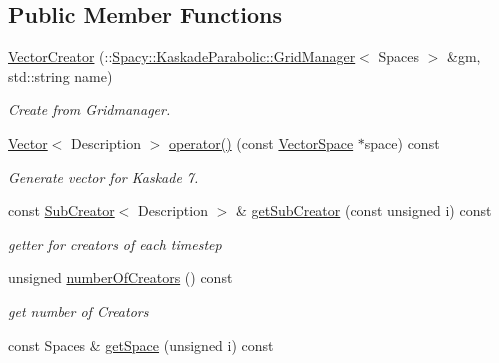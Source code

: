 \subsection*{Public Member Functions}
\begin{DoxyCompactItemize}
\item 
\hyperlink{group__VectorSpaceGroup_ga9312a30ec070498e2364676714caf125}{Vector\-Creator} (\-::\hyperlink{classSpacy_1_1KaskadeParabolic_1_1GridManager}{Spacy\-::\-Kaskade\-Parabolic\-::\-Grid\-Manager}$<$ Spaces $>$ \&gm, std\-::string name)
\begin{DoxyCompactList}\small\item\em Create from Gridmanager. \end{DoxyCompactList}\item 
\hypertarget{classSpacy_1_1KaskadeParabolic_1_1VectorCreator_a45f48ed0e7f995aaa3e85c5755a94aeb}{\hyperlink{classSpacy_1_1KaskadeParabolic_1_1Vector}{Vector}$<$ Description $>$ \hyperlink{classSpacy_1_1KaskadeParabolic_1_1VectorCreator_a45f48ed0e7f995aaa3e85c5755a94aeb}{operator()} (const \hyperlink{classSpacy_1_1VectorSpace}{Vector\-Space} $\ast$space) const }\label{classSpacy_1_1KaskadeParabolic_1_1VectorCreator_a45f48ed0e7f995aaa3e85c5755a94aeb}

\begin{DoxyCompactList}\small\item\em Generate vector for Kaskade 7. \end{DoxyCompactList}\item 
const \hyperlink{classSpacy_1_1KaskadeParabolic_1_1SubCreator}{Sub\-Creator}$<$ Description $>$ \& \hyperlink{classSpacy_1_1KaskadeParabolic_1_1VectorCreator_a439adcac03d88d849091aea0755a2710}{get\-Sub\-Creator} (const unsigned i) const 
\begin{DoxyCompactList}\small\item\em getter for creators of each timestep \end{DoxyCompactList}\item 
\hypertarget{classSpacy_1_1KaskadeParabolic_1_1VectorCreator_a7ccc807fbce17b6018f2a80561f2eda5}{unsigned \hyperlink{classSpacy_1_1KaskadeParabolic_1_1VectorCreator_a7ccc807fbce17b6018f2a80561f2eda5}{number\-Of\-Creators} () const }\label{classSpacy_1_1KaskadeParabolic_1_1VectorCreator_a7ccc807fbce17b6018f2a80561f2eda5}

\begin{DoxyCompactList}\small\item\em get number of Creators \end{DoxyCompactList}\item 
\hypertarget{classSpacy_1_1KaskadeParabolic_1_1VectorCreator_a68f68735b766af8d57fe09a63418836c}{const Spaces \& \hyperlink{classSpacy_1_1KaskadeParabolic_1_1VectorCreator_a68f68735b766af8d57fe09a63418836c}{get\-Space} (unsigned i) const }\label{classSpacy_1_1KaskadeParabolic_1_1VectorCreator_a68f68735b766af8d57fe09a63418836c}


\end{DoxyCompactItemize}
